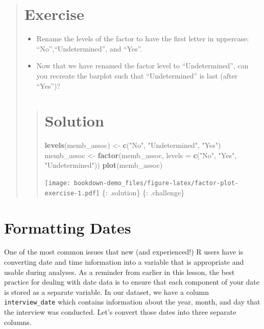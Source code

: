 \documentclass[]{book}
\newenvironment{Shaded}{\begin{snugshade}}{\end{snugshade}}
\newcommand{\KeywordTok}[1]{\textcolor[rgb]{0.13,0.29,0.53}{\textbf{#1}}}
\newcommand{\DataTypeTok}[1]{\textcolor[rgb]{0.13,0.29,0.53}{#1}}
\newcommand{\StringTok}[1]{\textcolor[rgb]{0.31,0.60,0.02}{#1}}
\newcommand{\NormalTok}[1]{#1}
\begin{document}
\begin{quote}
\section{Exercise}\label{exercise-7}

\begin{itemize}
\item
  Rename the levels of the factor to have the first letter in uppercase:
  ``No'',``Undetermined'', and ``Yes''.
\item
  Now that we have renamed the factor level to ``Undetermined'', can you
  recreate the barplot such that ``Undetermined'' is last (after
  ``Yes'')?
\end{itemize}

\begin{quote}
\section{Solution}\label{solution-8}

\begin{Shaded}
\begin{Highlighting}[]
\KeywordTok{levels}\NormalTok{(memb_assoc) <-}\StringTok{ }\KeywordTok{c}\NormalTok{(}\StringTok{"No"}\NormalTok{, }\StringTok{"Undetermined"}\NormalTok{, }\StringTok{"Yes"}\NormalTok{)}
\NormalTok{memb_assoc <-}\StringTok{ }\KeywordTok{factor}\NormalTok{(memb_assoc, }\DataTypeTok{levels =} \KeywordTok{c}\NormalTok{(}\StringTok{"No"}\NormalTok{, }\StringTok{"Yes"}\NormalTok{, }\StringTok{"Undetermined"}\NormalTok{))}
\KeywordTok{plot}\NormalTok{(memb_assoc)}
\end{Highlighting}
\end{Shaded}

\texttt{[image: bookdown-demo\_files/figure-latex/factor-plot-exercise-1.pdf]}
\{: .solution\} \{: .challenge\}
\end{quote}
\end{quote}

\section{Formatting Dates}\label{formatting-dates}

One of the most common issues that new (and experienced!) R users have
is converting date and time information into a variable that is
appropriate and usable during analyses. As a reminder from earlier in
this lesson, the best practice for dealing with date data is to ensure
that each component of your date is stored as a separate variable. In
our dataset, we have a column \texttt{interview\_date} which contains
information about the year, month, and day that the interview was
conducted. Let's convert those dates into three separate columns.
\end{document}
